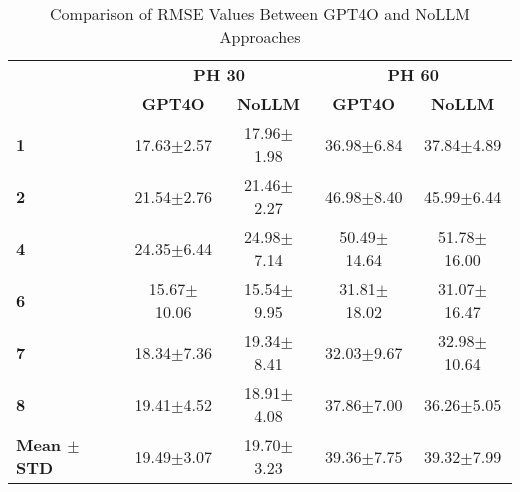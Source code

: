 \begin{table}
\caption{Comparison of RMSE Values Between GPT4O and NoLLM Approaches}
\label{tab:rmse_comparison}
\centering
\renewcommand{\arraystretch}{1.3}
\begin{tabular}{|l|cc|cc|}
\hline
\rowcolor{gray!20} \multirow{1}{*}{\textbf{Patient}} & \multicolumn{2}{c|}{\textbf{PH 30}} & \multicolumn{2}{c|}{\textbf{PH 60}} \\[+0.5ex]
\rowcolor{gray!20} & \textbf{GPT4O} & \textbf{NoLLM} & \textbf{GPT4O} & \textbf{NoLLM} \\[-1.5ex]
\hline
\rowcolor{gray!10}
\textbf{1} & 17.63$\pm$2.57 & 17.96$\pm$1.98 & 36.98$\pm$6.84 & 37.84$\pm$4.89 \\
\hline
\textbf{2} & 21.54$\pm$2.76 & 21.46$\pm$2.27 & 46.98$\pm$8.40 & 45.99$\pm$6.44 \\
\hline
\rowcolor{gray!10}
\textbf{4} & 24.35$\pm$6.44 & 24.98$\pm$7.14 & 50.49$\pm$14.64 & 51.78$\pm$16.00 \\
\hline
\textbf{6} & 15.67$\pm$10.06 & 15.54$\pm$9.95 & 31.81$\pm$18.02 & 31.07$\pm$16.47 \\
\hline
\rowcolor{gray!10}
\textbf{7} & 18.34$\pm$7.36 & 19.34$\pm$8.41 & 32.03$\pm$9.67 & 32.98$\pm$10.64 \\
\hline
\textbf{8} & 19.41$\pm$4.52 & 18.91$\pm$4.08 & 37.86$\pm$7.00 & 36.26$\pm$5.05 \\
\hline
\rowcolor{gray!20}
\textbf{Mean $\pm$ STD} & 19.49$\pm$3.07 & 19.70$\pm$3.23 & 39.36$\pm$7.75 & 39.32$\pm$7.99 \\
\hline
\end{tabular}
\end{table}